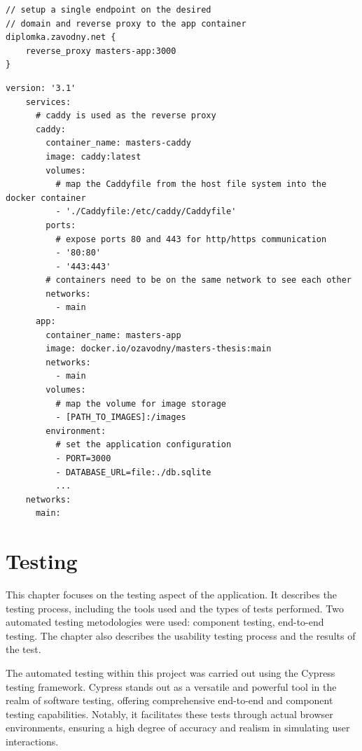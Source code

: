 \begin{lstlisting}[label={lst:caddyfile},caption={The Caddyfile for the reverse proxy.}]
// setup a single endpoint on the desired 
// domain and reverse proxy to the app container 
diplomka.zavodny.net {
    reverse_proxy masters-app:3000
}
\end{lstlisting}
\begin{lstlisting}[label={lst:docker-compose},caption={The docker-compose.yml file}]
    version: '3.1'
    services:
      # caddy is used as the reverse proxy
      caddy:
        container_name: masters-caddy
        image: caddy:latest
        volumes:
          # map the Caddyfile from the host file system into the docker container
          - './Caddyfile:/etc/caddy/Caddyfile'
        ports:
          # expose ports 80 and 443 for http/https communication
          - '80:80'
          - '443:443'
        # containers need to be on the same network to see each other
        networks:
          - main
      app:
        container_name: masters-app
        image: docker.io/ozavodny/masters-thesis:main
        networks:
          - main
        volumes:
          # map the volume for image storage
          - [PATH_TO_IMAGES]:/images
        environment:
          # set the application configuration
          - PORT=3000
          - DATABASE_URL=file:./db.sqlite
          ...
    networks:
      main:
\end{lstlisting}

\chapter{Testing}

This chapter focuses on the testing aspect of the application. It describes the testing process, including the tools used and the types of tests performed. Two automated testing metodologies were used: component testing, end-to-end testing. The chapter also describes the usability testing process and the results of the test.

The automated testing within this project was carried out using the Cypress testing framework. Cypress stands out as a versatile and powerful tool in the realm of software testing, offering comprehensive end-to-end and component testing capabilities. Notably, it facilitates these tests through actual browser environments, ensuring a high degree of accuracy and realism in simulating user interactions.\cite{why-cypress}

